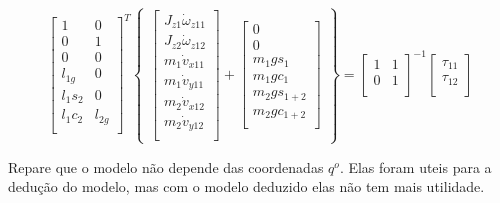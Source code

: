 \begin{itemize}
\begin{itemize}
	\begin{equation}
	\begin{bmatrix}
	1 & 0 \\
	0 & 1 \\
	0 & 0 \\
	l_{1g} & 0\\
	l_1 s_{2} & 0 \\
	l_1 c_{2} & l_{2g} \\
	\end{bmatrix}^T
	\begin{Bmatrix}
		\begin{bmatrix}
		J_{z1} \dot{\omega}_{z11} \\
		J_{z2} \dot{\omega}_{z12} \\
		m_1 \dot{v}_{x11} \\ 
		m_1 \dot{v}_{y11} \\
		m_2 \dot{v}_{x12} \\
		m_2 \dot{v}_{y12} \\
		\end{bmatrix}
		+
		\begin{bmatrix}
		0 \\
		0 \\
		m_1 g s_{1} \\
		m_1 g c_{1} \\
		m_2 g s_{1+2} \\
		m_2 g c_{1+2} \\
		\end{bmatrix}
	\end{Bmatrix}
	=
	\begin{bmatrix}
	1 & 1 \\
	0 & 1 \\
	\end{bmatrix}^{-1}
	\begin{bmatrix}
	\tau_{11} \\
	\tau_{12} \\
	\end{bmatrix}
	\end{equation}
	
	Repare que o modelo não depende das coordenadas $q^o$. Elas foram uteis para a dedu\c{c}\~ao do modelo, mas com o modelo deduzido elas não tem mais utilidade.
	
	
	
	
	\end{itemize}
\end{itemize}

